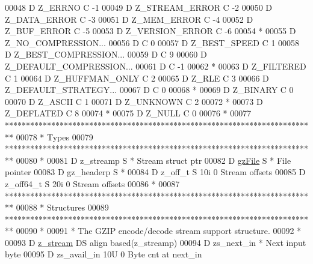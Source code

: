 \begin{DoxyCode}
00048      D Z\_ERRNO         C                   -1
00049      D Z\_STREAM\_ERROR  C                   -2
00050      D Z\_DATA\_ERROR    C                   -3
00051      D Z\_MEM\_ERROR     C                   -4
00052      D Z\_BUF\_ERROR     C                   -5
00053      D Z\_VERSION\_ERROR C                   -6
00054       *
00055      D Z\_NO\_COMPRESSION...
00056      D                 C                   0
00057      D Z\_BEST\_SPEED    C                   1
00058      D Z\_BEST\_COMPRESSION...
00059      D                 C                   9
00060      D Z\_DEFAULT\_COMPRESSION...
00061      D                 C                   -1
00062       *
00063      D Z\_FILTERED      C                   1
00064      D Z\_HUFFMAN\_ONLY  C                   2
00065      D Z\_RLE           C                   3
00066      D Z\_DEFAULT\_STRATEGY...
00067      D                 C                   0
00068       *
00069      D Z\_BINARY        C                   0
00070      D Z\_ASCII         C                   1
00071      D Z\_UNKNOWN       C                   2
00072       *
00073      D Z\_DEFLATED      C                   8
00074       *
00075      D Z\_NULL          C                   0
00076       *
00077       **************************************************************************
00078       *                                 Types
00079       **************************************************************************
00080       *
00081      D z\_streamp       S               *                                        Stream struct ptr
00082      D \hyperlink{structgz_file__s}{gzFile}          S               *                                        File pointer
00083      D gz\_headerp      S               *
00084      D z\_off\_t         S             10i 0                                      Stream offsets
00085      D z\_off64\_t       S             20i 0                                      Stream offsets
00086       *
00087       **************************************************************************
00088       *                               Structures
00089       **************************************************************************
00090       *
00091       *  The GZIP encode/decode stream support structure.
00092       *
00093      D \hyperlink{structz__stream__s}{z\_stream}        DS                  align based(z\_streamp)
00094      D  zs\_next\_in                     *                                        Next input byte
00095      D  zs\_avail\_in                  10U 0                                      Byte cnt at next\_in

\end{DoxyCode}
